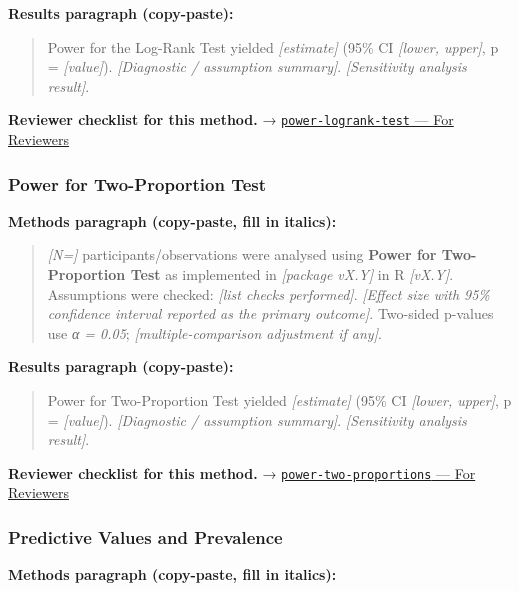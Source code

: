\documentclass[
]{article}
\begin{document}
\textbf{Results paragraph (copy-paste):}

\begin{quote}
Power for the Log-Rank Test yielded \emph{{[}estimate{]}} (95\% CI
\emph{{[}lower, upper{]}}, p = \emph{{[}value{]}}). \emph{{[}Diagnostic
/ assumption summary{]}}. \emph{{[}Sensitivity analysis result{]}}.
\end{quote}

\textbf{Reviewer checklist for this method.} →
\href{../chapters/05-power/power-logrank-test.Rmd\#for-reviewers}{\texttt{power-logrank-test}
--- For Reviewers}

\subsubsection{Power for Two-Proportion
Test}\label{power-for-two-proportion-test}

\textbf{Methods paragraph (copy-paste, fill in italics):}

\begin{quote}
\emph{{[}N={]}} participants/observations were analysed using
\textbf{Power for Two-Proportion Test} as implemented in
\emph{{[}package vX.Y{]}} in R \emph{{[}vX.Y{]}}. Assumptions were
checked: \emph{{[}list checks performed{]}}. \emph{{[}Effect size with
95\% confidence interval reported as the primary outcome{]}}. Two-sided
p-values use \emph{α = 0.05}; \emph{{[}multiple-comparison adjustment if
any{]}}.
\end{quote}

\textbf{Results paragraph (copy-paste):}

\begin{quote}
Power for Two-Proportion Test yielded \emph{{[}estimate{]}} (95\% CI
\emph{{[}lower, upper{]}}, p = \emph{{[}value{]}}). \emph{{[}Diagnostic
/ assumption summary{]}}. \emph{{[}Sensitivity analysis result{]}}.
\end{quote}

\textbf{Reviewer checklist for this method.} →
\href{../chapters/05-power/power-two-proportions.Rmd\#for-reviewers}{\texttt{power-two-proportions}
--- For Reviewers}

\subsubsection{Predictive Values and
Prevalence}\label{predictive-values-and-prevalence}

\textbf{Methods paragraph (copy-paste, fill in italics):}
\end{document}
